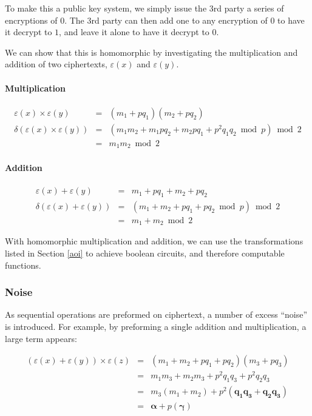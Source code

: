 \documentclass[a4paper,10pt]{article}
\begin{document}
To make this a public key system, we simply issue the 3rd party a
series of encryptions of $0$. The 3rd party can then add one to any
encryption of $0$ to have it decrypt to $1$, and leave it alone to
have it decrypt to $0$.

We can show that this is homomorphic by investigating the
multiplication and addition of two ciphertexts, $ \varepsilon(x) $
and $ \varepsilon(y) $.

\paragraph{Multiplication}
\begin{eqnarray*}
\varepsilon(x) \times \varepsilon(y) &=& (m_1 + p q_1)(m_2 + p q_2)\\
\delta(\varepsilon(x) \times \varepsilon(y))&=& (m_1m_2 + m_1pq_2 + m_2pq_1 + p^2q_1q_2 \bmod p) \bmod 2\\
&=& m_1m_2 \bmod 2
\end{eqnarray*}

\paragraph{Addition}
\begin{eqnarray*}
\varepsilon(x) + \varepsilon(y) &=& m_1 + p q_1 + m_2 + p q_2\\
\delta(\varepsilon(x) + \varepsilon(y))&=& (m_1 + m_2 + pq_1 + pq_2 \bmod p) \bmod 2\\
&=& m_1 + m_2 \bmod 2
\end{eqnarray*}

With homomorphic multiplication and addition, we can use the
transformations listed in Section \ref{aoi} to achieve boolean
circuits, and therefore computable functions.

\subsubsection{Noise}
As sequential operations are preformed on ciphertext, a number of
excess ``noise'' is introduced. For example, by preforming a single
addition and multiplication, a large term appears:

\begin{eqnarray*}
(\varepsilon(x) + \varepsilon(y)) \times \varepsilon(z) &=&(m_1 + m_2 + pq_1 + pq_2)(m_3 + pq_3)\\
&=&m_1m_3 + m_2m_3 + p^2q_1q_3 + p^2q_2q_3\\
&=&m_3(m_1 + m_2) + p^2(\mathbf{q_1q_3 + q_2q_3})\\
&=&\mathbf{\alpha} + p(\mathbf{\gamma})
\end{eqnarray*}
\end{document}
